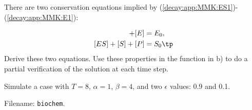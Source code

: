 \documentclass[graybox,sectrefs,envcountresetchap,open=right,final]{svmonodo}
\newenvironment{doconceexercise}{}{}
\begin{document}
\begin{doconceexercise}
There are two conservation equations implied by
(\ref{decay:app:MMK:ES1})-(\ref{decay:app:MMK:E1}):

\begin{align}
[ES] + [E] &= E_0,\\ 
[ES] + [S] + [P] &= S_0\tp
\end{align}
Derive these two equations. Use these properties in the function
in b) to do a partial verification of the solution at each time step.



Simulate a case with $T=8$, $\alpha = 1$, $\beta=4$, and two
$\epsilon$ values: 0.9 and 0.1.



\noindent Filename: \texttt{biochem}.

\end{doconceexercise}
\end{document}
